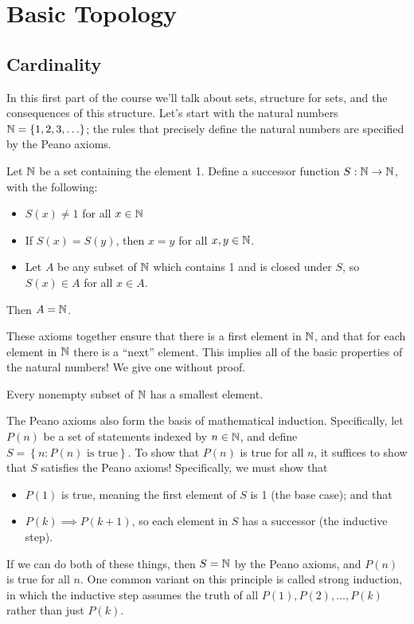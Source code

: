 \documentclass[../m131main.tex]{subfiles}
\begin{document}
\chapter{Basic Topology} \label{ch:topology}
\section{Cardinality}
In this first part of the course we'll talk about sets, structure for sets, and the consequences of this structure.
Let's start with the natural numbers $\mathbb{N} = \left\{ 1, 2, 3, \ldots \right\}$; the rules that precisely define the natural numbers are specified by the Peano axioms.

\begin{definition}
    Let $\mathbb{N}$ be a set containing the element 1.
    Define a successor function $S : \mathbb{N} \to \mathbb{N}$, with the following:
    \begin{itemize}
        \item $S(x) \neq 1$ for all $x \in \mathbb{N}$
        \item If $S(x) = S(y)$, then $x = y$ for all $x,y \in \mathbb{N}$.
        \item Let $A$ be any subset of $\mathbb{N}$ which contains 1 and is closed under $S$, so $S(x) \in A$ for all $x \in A$.
    \end{itemize}
    Then $A = \mathbb{N}$.
\end{definition} %

These axioms together ensure that there is a first element in $\mathbb{N}$, and that for each element in $\mathbb{N}$ there is a ``next'' element.
This implies all of the basic properties of the natural numbers!
We give one without proof.

\begin{theorem}
    Every nonempty subset of $\mathbb{N}$ has a smallest element.
\end{theorem}

The Peano axioms also form the basis of mathematical induction.
Specifically, let $P(n)$ be a set of statements indexed by $n \in \mathbb{N}$, and define $S = \left\{ n : P(n) \text{ is true} \right\}$.
To show that $P(n)$ is true for all $n$, it suffices to show that $S$ satisfies the Peano axioms!
Specifically, we must show that
\begin{itemize}
    \item $P(1)$ is true, meaning the first element of $S$ is 1 (the base case); and that
    \item $P(k) \implies P(k+1)$, so each element in $S$ has a successor (the inductive step).
\end{itemize}
If we can do both of these things, then $S = \mathbb{N}$ by the Peano axioms, and $P(n)$ is true for all $n$.
One common variant on this principle is called strong induction, in which the inductive step assumes the truth of all $P(1), P(2), \ldots, P(k)$ rather than just $P(k)$.
\end{document}
